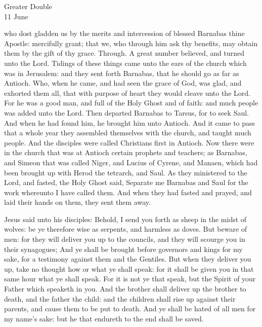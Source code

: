 

\begin{inhead}
    {Greater Double\\
11 June}
\end{inhead}
\collect
{} who dost gladden us by the merits and intercession of blessed Barnabas thine Apostle: mercifully grant; that we, who through him ask thy benefits, may obtain them by the gift of thy grace. Through.
 A great number believed, and turned unto the Lord. Tidings of these things came unto the ears of the church which was in Jerusalem: and they sent forth Barnabas, that he should go as far as Antioch. Who, when he came, and had seen the grace of God, was glad, and exhorted them all, that with purpose of heart they would cleave unto the Lord. For he was a good man, and full of the Holy Ghost and of faith: and much people was added unto the Lord. Then departed Barnabas to Tarsus, for to seek Saul. And when he had found him, he brought him unto Antioch. And it came to pass that a whole year they assembled themselves with the church, and taught much people. And the disciples were called Christians first in Antioch. %
Now there were in the church that was at Antioch certain prophets and teachers; as Barnabas, and Simeon that was called Niger, and Lucius of Cyrene, and Manaen, which had been brought up with Herod the tetrarch, and Saul. As they ministered to the Lord, and fasted, the Holy Ghost said, Separate me Barnabas and Saul for the work whereunto I have called them. And when they had fasted and prayed, and laid their hands on them, they sent them away.

 Jesus said unto his disciples: Behold, I send you forth as sheep in the midst of wolves: be ye therefore wise as serpents, and harmless as doves. But beware of men: for they will deliver you up to the councils, and they will scourge you in their synagogues; And ye shall be brought before governors and kings for my sake, for a testimony against them and the Gentiles. But when they deliver you up, take no thought how or what ye shall speak: for it shall be given you in that same hour what ye shall speak. For it is not ye that speak, but the Spirit of your Father which speaketh in you. And the brother shall deliver up the brother to death, and the father the child: and the children shall rise up against their parents, and cause them to be put to death. And ye shall be hated of all men for my name's sake: but he that endureth to the end shall be saved.

